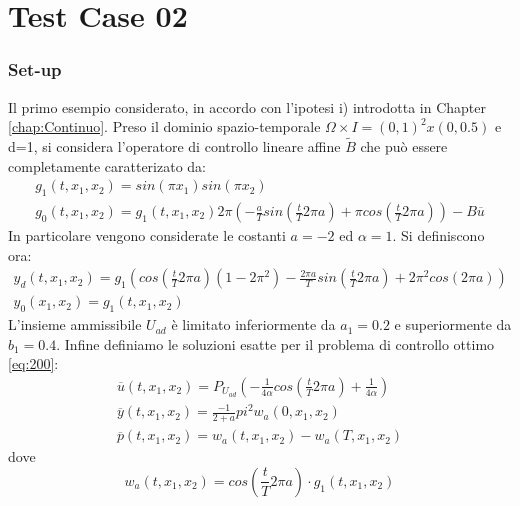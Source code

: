 \section{Test Case 02}
\subsubsection{Set-up}
Il primo esempio considerato, in accordo con l'ipotesi i) introdotta in Chapter \ref{chap:Continuo}.
Preso il dominio spazio-temporale $\Omega \times I = (0,1)^2 x(0,0.5)$ e d=1, si considera l'operatore di controllo lineare affine $\tilde{B}$ che può essere completamente caratterizato da:
{\renewcommand\arraystretch{2}
\begin{equation}
\begin{array}{c}
g_1(t,x_1,x_2) = sin({\pi}x_1)sin({\pi}x_2)\\
g_0(t,x_1,x_2) = g_1(t,x_1,x_2) 2\pi \left( -\frac{a}{T}sin\left( \frac{t}{T}2{\pi}a \right) + \pi cos\left( \frac{t}{T}2{\pi}a \right) \right) - B\overline{u}
\end{array}
\label{eq:505}
\end{equation}
}
In particolare vengono considerate le costanti $a=-2$ ed $\alpha=1$.
Si definiscono ora:
{\renewcommand\arraystretch{2}
\begin{equation}
\begin{array}{c}
y_d(t,x_1,x_2) = g_1\left( cos\left( \frac{t}{T}2{\pi}a \right)(1-2{\pi}^2) -\frac{2{\pi}a}{T}sin\left( \frac{t}{T}2{\pi}a \right) +2{\pi}^2cos(2{\pi}a) \right)\\
y_0(x_1,x_2) = g_1(t,x_1,x_2)
\end{array}
\label{eq:506}
\end{equation}
}
L'insieme ammissibile $U_{ad}$ è limitato inferiormente da $a_1=0.2$ e superiormente da $b_1=0.4$.
Infine definiamo le soluzioni esatte per il problema di controllo ottimo \ref{eq:200}:
{\renewcommand\arraystretch{2}
\begin{equation}
\begin{array}{c}
\overline{u}(t,x_1,x_2) = P_{U_{ad}} \left( -\frac{1}{4\alpha}cos \left( \frac{t}{T}2{\pi}a \right) +\frac{1}{4\alpha} \right) \\
\overline{y}(t,x_1,x_2) = \frac{- 1}{2 + a}{pi}^2w_a(0,x_1,x_2) \\
\overline{p}(t,x_1,x_2) = w_a(t,x_1,x_2) - w_a(T,x_1,x_2)
\end{array}
\label{eq:507}
\end{equation}
}
dove
\begin{equation}
w_a(t,x_1,x_2) = cos \left( \frac{t}{T}2{\pi}a \right) \cdot g_1(t,x_1,x_2)
\label{eq:508}
\end{equation}

